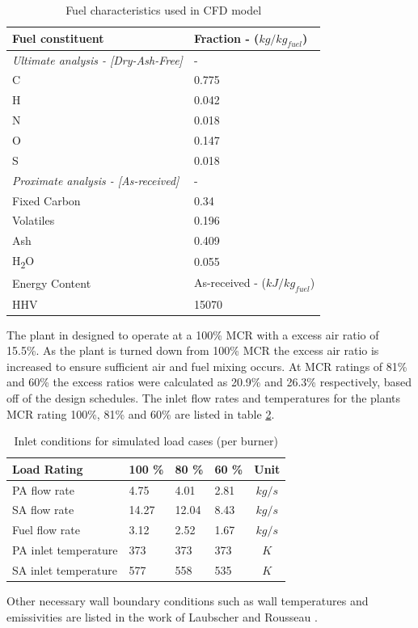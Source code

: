 \documentclass{webofc}
\begin{document}
\begin{table}[h!]
\centering
\caption{Fuel characteristics used in CFD model} \label{tab_fuel}
\begin{tabular}{ll}
\hline
Fuel constituent & Fraction - ($kg/kg_{fuel}$)   \\
\hline
\textit{Ultimate analysis - [Dry-Ash-Free]} & -  \\
C & 0.775 \\
H & 0.042 \\
N & 0.018 \\
O & 0.147 \\
S & 0.018 \\
\textit{Proximate analysis - [As-received]} & -\\
Fixed Carbon & 0.34\\
Volatiles & 0.196\\
Ash & 0.409\\
H\textsubscript{2}O & 0.055\\
\hline
Energy Content & As-received - ($kJ/kg_{fuel}$)\\
\hline
HHV & 15070 \\
\hline
\end{tabular}
\end{table}

The plant in designed to operate at a 100\% MCR with a excess air ratio of 15.5\%. As the plant is turned down from 100\% MCR the excess air ratio is increased to ensure sufficient air and fuel mixing occurs. At MCR ratings of 81\% and 60\% the excess ratios were calculated as 20.9\% and 26.3\% respectively, based off of the design schedules. The inlet flow rates and temperatures for the plants MCR rating 100\%, 81\% and 60\% are listed in table \ref{tab_inlets}.
\begin{table}[h!]
\centering
\caption{Inlet conditions for simulated load cases (per burner)}\label{tab_inlets}       
\begin{tabular}{llllc}
\hline
Load Rating & 100 \% & 80 \% & 60 \% & Unit  \\
\hline
PA flow rate & 4.75 & 4.01 & 2.81 & $kg/s$   \\
SA flow rate & 14.27 & 12.04 & 8.43 & $kg/s$ \\
Fuel flow rate & 3.12 & 2.52 & 1.67 & $kg/s$ \\
PA inlet temperature & 373 & 373 & 373 & $K$ \\
SA inlet temperature & 577 &558 & 535 & $K$  \\
\hline
\end{tabular}
\end{table}
Other necessary wall boundary conditions such as wall temperatures and emissivities are listed in the work of Laubscher and Rousseau \cite{laubscher_1}.
\end{document}
